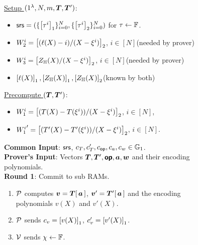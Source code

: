 \begin{figure}[t!]
    \begin{mdframed}

        \underline{Setup $(1^\secp,N,m, \vecT, \vecT')$}:
        \begin{itemize}[leftmargin=1em]
            \item $\mathsf{srs} = (\{\left[{\tau^i}\right]_1\}_{i=0}^N, \{\left[{\tau^i}\right]_2\}_{i=0}^N)$ for $\tau\gets \mathbb{F}$.
            \item $W_2^i=\left[{(\ell(X) - i)/(X-\xi^i)}\right]_2$, $i\in [N]$(needed by prover)
            \item $W_3^i=\left[{Z_\mathbb{H}(X)/(X-\xi^i)}\right]_2$, $i\in [N]$(needed by prover)
            \item $\left[{\ell(X)}\right]_1, \left[{Z_\mathbb{H}(X)}\right]_1, \left[{Z_\mathbb{H}(X)}\right]_2$(known by both)
        \end{itemize}

        \underline{Precompute $(\vecT, \vecT')$}:
        \begin{itemize}[leftmargin=1em]
            \item $W_1^i=\left[{(T(X)-T(\xi^i))/(X-\xi^i)}\right]_2$, $i\in [N]$,
            \item ${W_1^i}'=\left[{(T'(X) - T'(\xi^i))/(X-\xi^i)}\right]_2$, $i\in [N]$.
        \end{itemize}

        {\bf Common Input}: $\mathsf{srs}$, $c_T, c_T', c_{\mathsf{op}}, c_a, c_w\in \mathbb{G}_1$.\\
        {\bf Prover's Input}: Vectors $\vecT,\vecT',\vec{\op},\vec{a},\vec{w}$ and their encoding polynomials.\\

        {\bf Round 1}: Commit to sub RAMs.
        \begin{enumerate}[leftmargin=1em, label=\arabic*.]
            \item $\mathcal{P}$ computes $\vec{v}=\vecT[\,\vec{a}\,]$, $\vec{v}'=\vecT'[\,\vec{a}\,]$ and the encoding
            polynomials $v(X)$ and $v'(X)$.
            \item $\mathcal{P}$ sends $c_v = \left[{v(X)}\right]_1$, $c_v'=\left[{v'(X)}\right]_1$.
            \item $\mathcal{V}$ sends $\chi\gets \mathbb{F}$.
        \end{enumerate}


\end{mdframed}
\end{figure}
